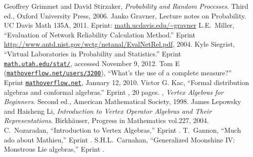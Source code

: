 \begin{thebibliography}{99}\small
{}
Geoffrey Grimmet and David Stirzaker,\newblock
\emph{Probability and Random Processes}.\newblock
Third ed., Oxford University Press, 2006.
Janko Gravner,\newblock
Lecture notes on Probability.\newblock
UC Davis Math 135A, 2011. Eprint: \href{http://www.math.ucdavis.edu/~gravner/MAT135A/resources/lecturenotes.pdf}{\url{math.ucdavis.edu/~gravner}}
L.E.~Miller,\newblock
``Evaluation of Network Reliability Calculation Method.''\newblock
Eprint \url{http://www.antd.nist.gov/wctg/netanal/EvalNetRel.pdf}, 2004.
Kyle Siegrist,\newblock
``Virtual Laboratories in Probability and Statistics.''\newblock
Eprint \href{http://www.math.uah.edu/stat/index.html}{\tt math.utah.edu/stat/}, accessed November
9, 2012.
 Tom E (\href{http://mathoverflow.net/users/3200/tom-e}{\tt mathoverflow.net/users/3200}),\newblock 
``What's the use of a complete measure?''\newblock
Eprint \href{http://mathoverflow.net/questions/11554}{\tt mathoverflow.net}, January 12, 2010.
Victor G. Kac,\newblock
``Formal distribution algebras and conformal algebras.''\newblock
Eprint , 20 pages.
  \bysame,\newblock
  \emph{Vertex Algebras for Beginners}.\newblock
  Second ed., American Mathematical Society, 1998.
  James Lepowsky and Haisheng Li, \newblock
  \emph{Introduction to Vertex Operator Algebras and Their Representations}.\newblock
  Birkh\"auser, Progress in Mathematics vol.227, 2004.
  C.~Nozaradan,\newblock
  ``Introduction to Vertex Algebras,''\newblock
  Eprint .
  T.~Gannon,\newblock
  ``Much ado about Mathieu,''\newblock
  Eprint .
  S.H.L.~Carnahan,\newblock
  ``Generalized Moonshine IV: Monstrous Lie algebras,''\newblock
  Eprint .
\end{thebibliography}
